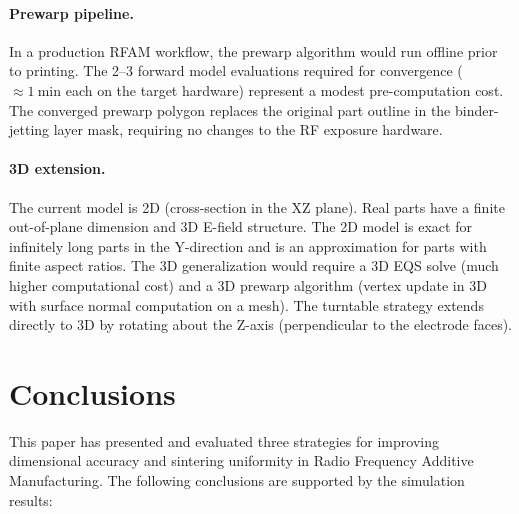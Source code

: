 \documentclass[10pt,twocolumn]{article}
\begin{document}
\paragraph{Prewarp pipeline.}
In a production RFAM workflow, the prewarp algorithm would run
offline prior to printing.  The 2--3 forward model evaluations required
for convergence ($\approx\SI{1}{\minute}$ each on the target hardware)
represent a modest pre-computation cost.  The converged prewarp polygon
replaces the original part outline in the binder-jetting layer mask,
requiring no changes to the RF exposure hardware.

\paragraph{3D extension.}
The current model is 2D (cross-section in the XZ plane).  Real parts
have a finite out-of-plane dimension and 3D E-field structure.  The
2D model is exact for infinitely long parts in the Y-direction and is
an approximation for parts with finite aspect ratios.  The 3D
generalization would require a 3D EQS solve (much higher computational
cost) and a 3D prewarp algorithm (vertex update in 3D with surface
normal computation on a mesh).  The turntable strategy extends directly
to 3D by rotating about the Z-axis (perpendicular to the electrode
faces).

\section{Conclusions}
\label{sec:conclusions}

This paper has presented and evaluated three strategies for improving
dimensional accuracy and sintering uniformity in Radio Frequency
Additive Manufacturing.  The following conclusions are supported by
the simulation results:
\end{document}
